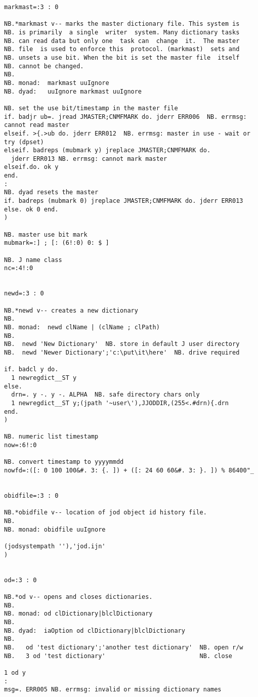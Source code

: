 \begin{lstlisting}[frame=single,framerule=0pt,basicstyle=\ttfamily\tiny]
markmast=:3 : 0

NB.*markmast v-- marks the master dictionary file. This system is
NB. is primarily  a single  writer  system. Many dictionary tasks
NB. can read data but only one  task can  change  it.  The master
NB. file  is used to enforce this  protocol. (markmast)  sets and
NB. unsets a use bit. When the bit is set the master file  itself
NB. cannot be changed.
NB.
NB. monad:  markmast uuIgnore
NB. dyad:   uuIgnore markmast uuIgnore

NB. set the use bit/timestamp in the master file
if. badjr ub=. jread JMASTER;CNMFMARK do. jderr ERR006  NB. errmsg: cannot read master
elseif. >{.>ub do. jderr ERR012  NB. errmsg: master in use - wait or try (dpset)
elseif. badreps (mubmark y) jreplace JMASTER;CNMFMARK do.
  jderr ERR013 NB. errmsg: cannot mark master
elseif.do. ok y
end.
:
NB. dyad resets the master
if. badreps (mubmark 0) jreplace JMASTER;CNMFMARK do. jderr ERR013 else. ok 0 end.
)

NB. master use bit mark
mubmark=:] ; [: (6!:0) 0: $ ]

NB. J name class
nc=:4!:0


newd=:3 : 0

NB.*newd v-- creates a new dictionary
NB.
NB. monad:  newd clName | (clName ; clPath)
NB.
NB.  newd 'New Dictionary'  NB. store in default J user directory
NB.  newd 'Newer Dictionary';'c:\put\it\here'  NB. drive required

if. badcl y do.
  1 newregdict__ST y
else.
  drn=. y -. y -. ALPHA  NB. safe directory chars only
  1 newregdict__ST y;(jpath '~user\'),JJODDIR,(255<.#drn){.drn
end.
)

NB. numeric list timestamp
now=:6!:0

NB. convert timestamp to yyyymmdd
nowfd=:([: 0 100 100&#. 3: {. ]) + ([: 24 60 60&#. 3: }. ]) % 86400"_


obidfile=:3 : 0

NB.*obidfile v-- location of jod object id history file.
NB.
NB. monad: obidfile uuIgnore

(jodsystempath ''),'jod.ijn'
)


od=:3 : 0

NB.*od v-- opens and closes dictionaries.
NB.
NB. monad: od clDictionary|blclDictionary
NB.
NB. dyad:  iaOption od clDictionary|blclDictionary
NB.
NB.   od 'test dictionary';'another test dictionary'  NB. open r/w
NB.   3 od 'test dictionary'                          NB. close

1 od y
:
msg=. ERR005 NB. errmsg: invalid or missing dictionary names


\end{lstlisting}
